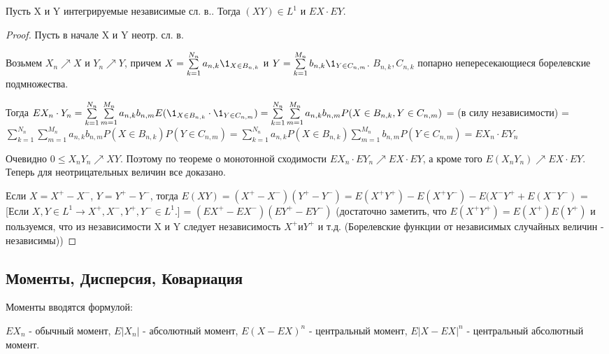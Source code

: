 		\begin{theorem}\label{lect8:th5}
			Пусть X и Y интегрируемые независимые сл. в.. Тогда $(XY) \in L^1$ и $EX \cdot EY$.
		\end{theorem}
		\begin{proof}
			Пусть в начале X и Y неотр. сл. в. 
			 
			Возьмем	$X_n \nearrow X$ и $Y_n \nearrow Y$, причем $X = \sum\limits_{k = 1}^{N_n} a_{n,k} \1_{X \in B_{n,k}}$ и $Y = \sum\limits_{k = 1}^{M_n} b_{n,k} \1_{Y \in C_{n,m}}$.
			$B_{n,k} , C_{n,k}$ попарно непересекающиеся борелевские подмножества.
			 
			Тогда $E X_n\cdot Y_n = \sum\limits_{k = 1}^{N_n}\sum\limits_{m = 1}^{M_n}a_{n,k}b_{n,m}E(\1_{X \in B_{n,k}}\cdot \1_{Y \in C_{n,m}}) = \sum\limits_{k = 1}^{N_n}\sum\limits_{m = 1}^{M_n}a_{n,k}b_{n,m} P(X \in B_{n,k},Y \in C_{n,m}) $ = (в силу независимости) = $\sum\limits_{k = 1}^{N_n}\sum\limits_{m = 1}^{M_n}a_{n,k}b_{n,m}P(X \in B_{n,k})P(Y \in C_{n,m}) =\sum\limits_{k = 1}^{N_n}a_{n,k}P(X \in B_{n,k})  \sum\limits_{m = 1}^{M_n}b_{n,m}P(Y \in C_{n,m}) = EX_n \cdot EY_n$	
			 
			Очевидно  $0 \le X_nY_n \nearrow XY$. Поэтому по теореме о монотонной сходимости $EX_n \cdot EY_n \nearrow EX\cdot EY$, а кроме того $E(X_nY_n) \nearrow EX\cdot EY$. Теперь для неотрицательных величин все доказано.
			 
			Если $X = X^{+}- X^{-}$, $Y = Y^{+}- Y^{-}$, тогда $E(XY) =( X^{+}- X^{-})(Y^{+}- Y^{-}) = E(X^{+}Y^{+}) - E(X^{+}Y^{-}) - E(X^{-}Y^{+} + E(X^{-}Y^{-}) $ = [Если $X, Y \in L^1 \to X^{+}, X^{-}, Y^{+},Y^{-} \in L^1$.] = $(EX^{+} - EX^{-})(EY^{+} - EY^{-})$ (достаточно заметить, что $E(X^{+}Y^{+}) = E(X^{+})E(Y^{+})$ и пользуемся, что из независимости X и Y следует независимость $X^{+} и Y^{+}$ и т.д. (Борелевские функции от независимых случайных величин - независимы))
		\end{proof}	
			
			
			\subsection{Моменты, Дисперсия, Ковариация}
			\begin{definition}\label{lect8:def1}
			Моменты вводятся формулой:
			 
			$EX_n$ - обычный момент, $E|X_n|$ - абсолютный момент, $E(X-EX)^n$ - центральный момент, $E|X-EX|^n$ - центральный абсолютный момент.
			\end{definition}
			
